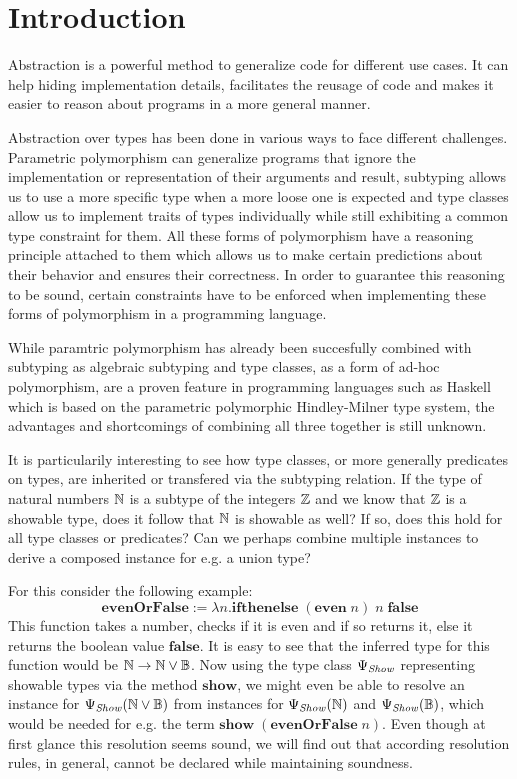 
\chapter{Introduction}\label{ch:intro}

Abstraction is a powerful method to generalize code for different use cases.
It can help hiding implementation details, facilitates the reusage of code and makes it easier to reason about programs in a more general manner.

Abstraction over types has been done in various ways to face different challenges.
Parametric polymorphism can generalize programs that ignore the implementation or representation of their arguments and result,
subtyping allows us to use a more specific type when a more loose one is expected
and type classes allow us to implement traits of types individually while still exhibiting a common type constraint for them.
All these forms of polymorphism have a reasoning principle attached to them which allows us to make certain predictions about their behavior and ensures their correctness.
In order to guarantee this reasoning to be sound, certain constraints have to be enforced when implementing these forms of polymorphism in a programming language.

While paramtric polymorphism has already been succesfully combined with subtyping as algebraic subtyping \cite{dolan2017subtyping}
and type classes, as a form of ad-hoc polymorphism, are a proven feature in programming languages such as Haskell \cite{wadlerblott} which is based on the parametric polymorphic Hindley-Milner type system,
the advantages and shortcomings of combining all three together is still unknown.

It is particularily interesting to see how type classes, or more generally predicates on types, are inherited or transfered via the subtyping relation.
If the type of natural numbers $\mathbb{N}$ is a subtype of the integers $\mathbb{Z}$ and we know that $\mathbb{Z}$ is a showable type, does it follow that $\mathbb{N}$ is showable as well?
If so, does this hold for all type classes or predicates?
Can we perhaps combine multiple instances to derive a composed instance for e.g. a union type?

For this consider the following example:
$$
\mathbf{evenOrFalse} := \lambda n. \mathbf{ifthenelse} \; (\mathbf{even} \; n) \; n \; \mathbf{false}
$$
This function takes a number, checks if it is even and if so returns it, else it returns the boolean value $\mathbf{false}$.
It is easy to see that the inferred type for this function would be $\mathbb{N} \to \mathbb{N} \vee \mathbb{B}$.
Now using the type class $\Psi_\mathit{Show}$ representing showable types via the method $\mathbf{show}$, we might even be able to resolve an instance for $\Psi_\mathit{Show}(\mathbb{N} \vee \mathbb{B})$ from instances
for $\Psi_\mathit{Show}(\mathbb{N})$ and $\Psi_\mathit{Show}(\mathbb{B})$, which would be needed for e.g. the term $\mathbf{show} \; (\mathbf{evenOrFalse} \; n)$.
Even though at first glance this resolution seems sound, we will find out that according resolution rules, in general, cannot be declared while maintaining soundness.

